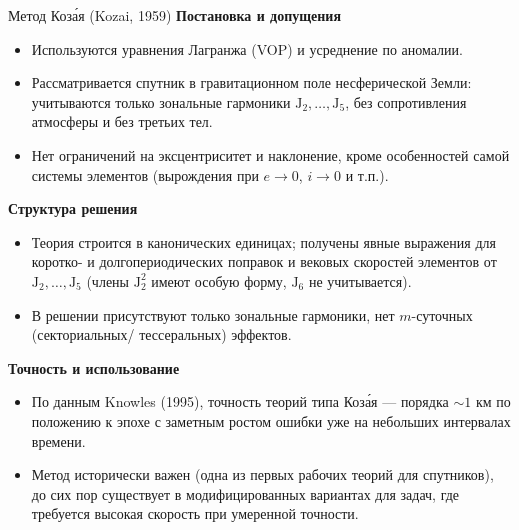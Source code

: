 \documentclass[8pt]{beamer}
\begin{document}
\begin{frame}{Метод Коза́я (Kozai, 1959)}
\textbf{Постановка и допущения}

\begin{itemize}
\justifying
  \item Используются уравнения Лагранжа (VOP) и усреднение по аномалии. 
  \item Рассматривается спутник в гравитационном поле несферической Земли:
        учитываются только зональные гармоники $\text{J}_2, \dots ,\text{J}_5$, без сопротивления атмосферы и без третьих тел. 
  \item Нет ограничений на эксцентриситет и наклонение, кроме особенностей самой
        системы элементов (вырождения при $e \to 0$, $i \to 0$ и т.п.).
\end{itemize}

\vspace{0.4em}
\textbf{Структура решения}

\begin{itemize}
\justifying
  \item Теория строится в канонических единицах; получены явные выражения для
        коротко- и долгопериодических поправок и вековых скоростей элементов от
        $\text{J}_2, \dots ,\text{J}_5$ (члены $\text{J}_2^2$ имеют особую форму, $\text{J}_6$ не учитывается). 
  \item В решении присутствуют только зональные гармоники, нет $m$-суточных
        (секториальных/ тессеральных) эффектов.
\end{itemize}

\vspace{0.4em}
\textbf{Точность и использование}

\begin{itemize}
\justifying
  \item По данным Knowles (1995), точность теорий типа Коза́я — порядка
        $\sim 1$ км по положению к эпохе с заметным ростом ошибки уже на
        небольших интервалах времени.
  \item Метод исторически важен (одна из первых рабочих теорий для спутников), до сих   пор существует в модифицированных вариантах для задач, где требуется высокая скорость при умеренной точности.
\end{itemize}

\end{frame}
\end{document}
